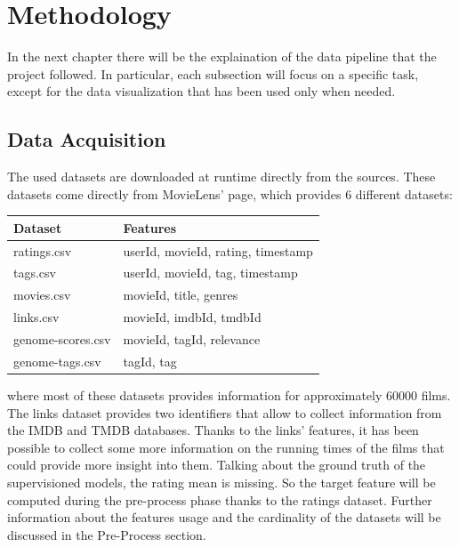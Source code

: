 \documentclass[../main]{subfiles}
\begin{document}
\chapter{Methodology}
In the next chapter there will be the explaination of the data pipeline that the project followed.
In particular, each subsection will focus on a specific task, except for the data visualization that has been used only when needed.

\section{Data Acquisition}
The used datasets are downloaded at runtime directly from the sources.
These datasets come directly from MovieLens' page, which provides 6 different datasets:

    \begin{table}[h]
        \begin{tabular}{|l | l|}
        \hline
        \textbf{Dataset} & \textbf{Features} \\
        \hline
        ratings.csv &  userId, movieId, rating, timestamp\\
        \hline
        tags.csv &  userId, movieId, tag, timestamp\\
        \hline
        movies.csv &  movieId, title, genres\\
        \hline
        links.csv &  movieId, imdbId, tmdbId\\
        \hline
        genome-scores.csv &  movieId, tagId, relevance\\
        \hline
        genome-tags.csv & tagId, tag\\
        \hline
        \end{tabular}
    \end{table}
        


where most of these datasets provides information for approximately 60000 films.
The links dataset provides two identifiers that allow to collect information from the IMDB and TMDB databases.
Thanks to the links' features, it has been possible to collect some more information on the running times of the films that could provide more insight into them.
Talking about the ground truth of the supervisioned models, the rating mean is missing. So the target feature will be computed during the pre-process phase thanks to the ratings dataset.
Further information about the features usage and the cardinality of the datasets will be discussed in the Pre-Process section.
\end{document}
